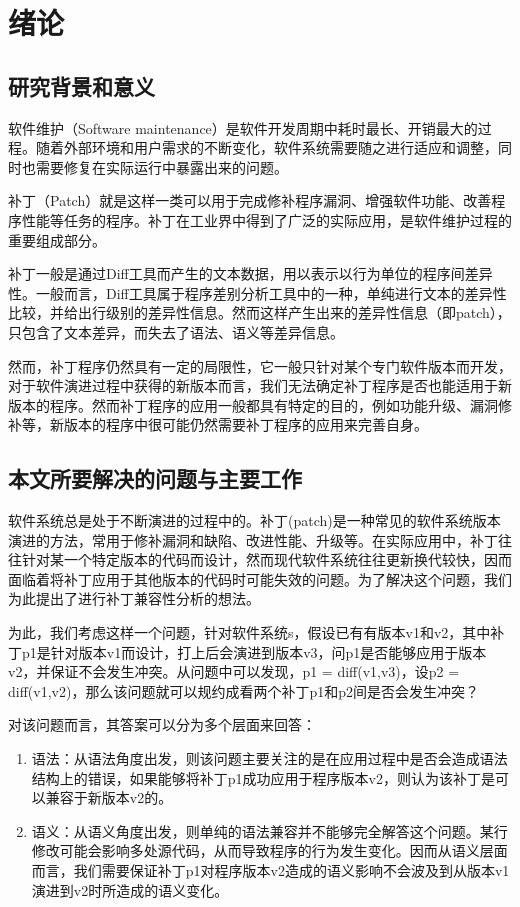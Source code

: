 \chapter{绪论}
\section{研究背景和意义}

软件维护（Software maintenance）是软件开发周期中耗时最长、开销最大的过程。随着外部环境和用户需求的不断变化，软件系统需要随之进行适应和调整，同时也需要修复在实际运行中暴露出来的问题。

补丁（Patch）就是这样一类可以用于完成修补程序漏洞、增强软件功能、改善程序性能等任务的程序。补丁在工业界中得到了广泛的实际应用，是软件维护过程的重要组成部分。

补丁一般是通过Diff工具而产生的文本数据，用以表示以行为单位的程序间差异性。一般而言，Diff工具属于程序差别分析工具中的一种，单纯进行文本的差异性比较，并给出行级别的差异性信息。然而这样产生出来的差异性信息（即patch），只包含了文本差异，而失去了语法、语义等差异信息。

然而，补丁程序仍然具有一定的局限性，它一般只针对某个专门软件版本而开发，对于软件演进过程中获得的新版本而言，我们无法确定补丁程序是否也能适用于新版本的程序。然而补丁程序的应用一般都具有特定的目的，例如功能升级、漏洞修补等，新版本的程序中很可能仍然需要补丁程序的应用来完善自身。



\section{本文所要解决的问题与主要工作}

软件系统总是处于不断演进的过程中的。补丁(patch)是一种常见的软件系统版本演进的方法，常用于修补漏洞和缺陷、改进性能、升级等。在实际应用中，补丁往往针对某一个特定版本的代码而设计，然而现代软件系统往往更新换代较快，因而面临着将补丁应用于其他版本的代码时可能失效的问题。为了解决这个问题，我们为此提出了进行补丁兼容性分析的想法。

为此，我们考虑这样一个问题，针对软件系统s，假设已有有版本v1和v2，其中补丁p1是针对版本v1而设计，打上后会演进到版本v3，问p1是否能够应用于版本v2，并保证不会发生冲突。从问题中可以发现，p1 = diff(v1,v3)，设p2 = diff(v1,v2)，那么该问题就可以规约成看两个补丁p1和p2间是否会发生冲突？

对该问题而言，其答案可以分为多个层面来回答：

\begin{enumerate}
	\item
	语法：从语法角度出发，则该问题主要关注的是在应用过程中是否会造成语法结构上的错误，如果能够将补丁p1成功应用于程序版本v2，则认为该补丁是可以兼容于新版本v2的。
	\item
	语义：从语义角度出发，则单纯的语法兼容并不能够完全解答这个问题。某行修改可能会影响多处源代码，从而导致程序的行为发生变化。因而从语义层面而言，我们需要保证补丁p1对程序版本v2造成的语义影响不会波及到从版本v1演进到v2时所造成的语义变化。
\end{enumerate}

